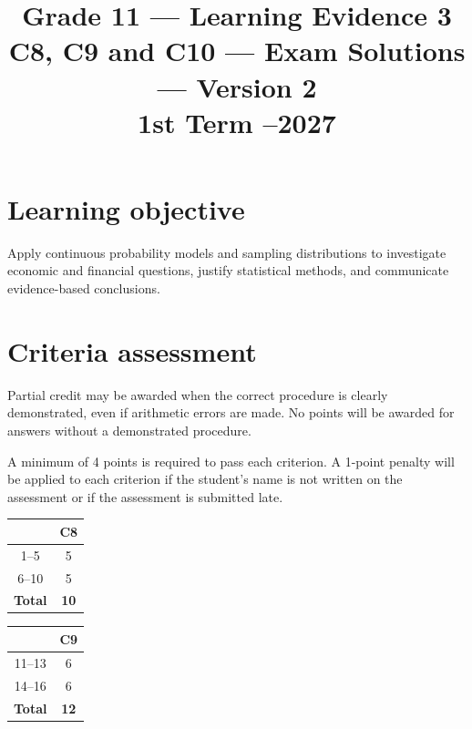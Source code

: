 \makeatletter
{}
\makeatother

\graphicspath{{./}{../}{../../}{../../../}{../../../../}{preamble/}{../preamble/}{../../preamble/}{../../../preamble/}{../../../../preamble/}}
\linespread{1.0}
\setlength{\parskip}{5pt}
\usepackage{needspace}
\title{Grade 11 --- Learning Evidence 3\\C8, C9 and C10 --- Exam Solutions --- Version 2\\\large 1st Term --2027}
\author{}
\date{}

\maketitle
\setcounter{tocdepth}{1}
\setcounter{secnumdepth}{2}
\label{toc}
\tableofcontents

\section*{Learning objective}
Apply continuous probability models and sampling distributions to investigate economic and financial questions, justify statistical methods, and communicate evidence-based conclusions.

\section*{Criteria assessment}
Partial credit may be awarded when the correct procedure is clearly demonstrated, even if arithmetic errors are made. No points will be awarded for answers without a demonstrated procedure.

A minimum of 4 points is required to pass each criterion. A 1-point penalty will be applied to each criterion if the student's name is not written on the assessment or if the assessment is submitted late.


\begin{center}
	\begin{tabular}{|c|c|}
		\hline
		\textbf{\textnumero} & \textbf{C8} \\ \hline
		1--5 & 5 \\ \hline
		6--10 & 5 \\ \hline
		\textbf{Total} & \textbf{10} \\ \hline
	\end{tabular}
	\hspace{1cm}
	\begin{tabular}{|c|c|}
		\hline
		\textbf{\textnumero} & \textbf{C9} \\ \hline
		11--13 & 6 \\ \hline
		14--16 & 6 \\ \hline
		\textbf{Total} & \textbf{12} \\ \hline
	\end{tabular}
\end{center}



